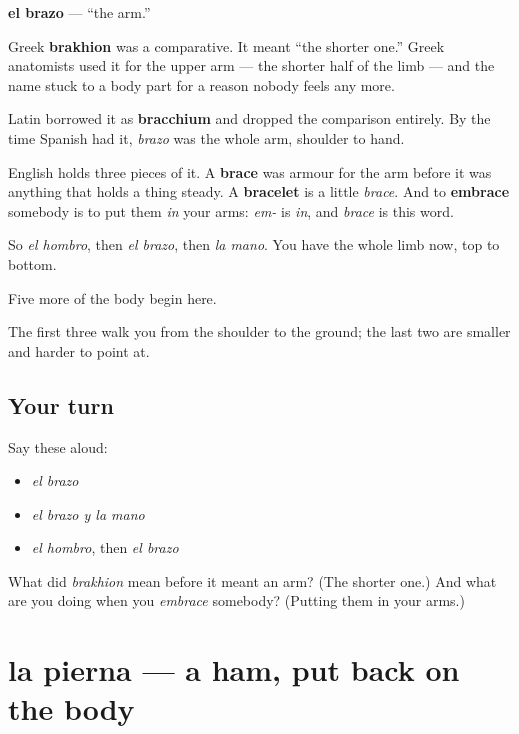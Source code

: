 \begin{cousinweb}
\textbf{el brazo} — \textquotedblleft{}the arm.\textquotedblright{}

Greek \textbf{brakhion} was a comparative. It meant \textquotedblleft{}the shorter one.\textquotedblright{} Greek anatomists used it for the upper arm — the shorter half of the limb — and the name stuck to a body part for a reason nobody feels any more.

Latin borrowed it as \textbf{bracchium} and dropped the comparison entirely. By the time Spanish had it, \emph{brazo} was the whole arm, shoulder to hand.

English holds three pieces of it. A \textbf{brace} was armour for the arm before it was anything that holds a thing steady. A \textbf{bracelet} is a little \emph{brace}. And to \textbf{embrace} somebody is to put them \emph{in} your arms: \emph{em-} is \emph{in}, and \emph{brace} is this word.

So \emph{el hombro}, then \emph{el brazo}, then \emph{la mano}. You have the whole limb now, top to bottom.
\end{cousinweb}

\begin{grammarlens}[title={What you've built}]
Five more of the body begin here.

The first three walk you from the shoulder to the ground; the last two are smaller and harder to point at.
\end{grammarlens}

\subsection*{Your turn}
Say these aloud:

\begin{itemize}
\raggedright
  \item \emph{el brazo}
  \item \emph{el brazo y la mano}
  \item \emph{el hombro}, then \emph{el brazo}
\end{itemize}

\begin{tcolorbox}[breakable,colback=teal!4,colframe=teal!35!black,title={Before you move on}]
What did \emph{brakhion} mean before it meant an arm? (The shorter one.) And what are you doing when you \emph{embrace} somebody? (Putting them in your arms.)
\end{tcolorbox}
\section[la pierna]{la pierna — a ham, put back on the body}

